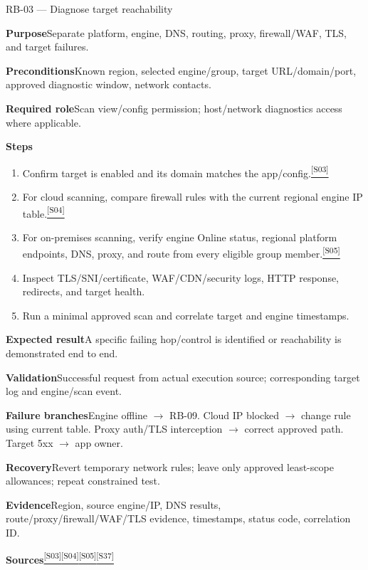 \documentclass[11pt,letterpaper,oneside]{scrreprt}
\newcommand{\src}[1]{\hyperref[src:#1]{\textsuperscript{\color{R7Orange}[#1]}}}
\newcommand{\field}[1]{\par\smallskip\noindent\textbf{#1}\quad}
\begin{document}
\begin{procedure}{RB-03 --- Diagnose target reachability}
\field{Purpose}Separate platform, engine, DNS, routing, proxy, firewall/WAF, TLS, and target failures.
\field{Preconditions}Known region, selected engine/group, target URL/domain/port, approved diagnostic window, network contacts.
\field{Required role}Scan view/config permission; host/network diagnostics access where applicable.
\field{Steps}
\begin{enumerate}
  \item Confirm target is enabled and its domain matches the app/config.\src{S03}
  \item For cloud scanning, compare firewall rules with the current regional engine IP table.\src{S04}
  \item For on-premises scanning, verify engine Online status, regional platform endpoints, DNS, proxy, and route from every eligible group member.\src{S05}
  \item Inspect TLS/SNI/certificate, WAF/CDN/security logs, HTTP response, redirects, and target health.
  \item Run a minimal approved scan and correlate target and engine timestamps.
\end{enumerate}
\field{Expected result}A specific failing hop/control is identified or reachability is demonstrated end to end.
\field{Validation}Successful request from actual execution source; corresponding target log and engine/scan event.
\field{Failure branches}Engine offline $\rightarrow$ RB-09. Cloud IP blocked $\rightarrow$ change rule using current table. Proxy auth/TLS interception $\rightarrow$ correct approved path. Target 5xx $\rightarrow$ app owner.
\field{Recovery}Revert temporary network rules; leave only approved least-scope allowances; repeat constrained test.
\field{Evidence}Region, source engine/IP, DNS results, route/proxy/firewall/WAF/TLS evidence, timestamps, status code, correlation ID.
\field{Sources}\src{S03}\src{S04}\src{S05}\src{S37}
\end{procedure}
\end{document}
